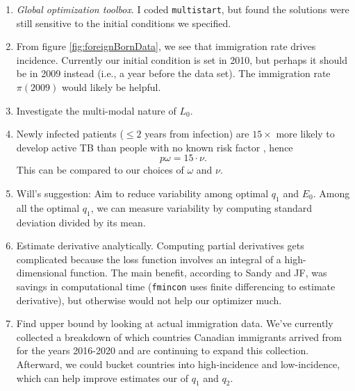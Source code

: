 \documentclass{article}
\begin{document}
\begin{enumerate}
		\item \emph{Global optimization toolbox}.  I coded \texttt{multistart}, but found the solutions were still sensitive to the initial conditions we specified. 
	\item From figure \ref{fig:foreignBornData}, we see that immigration rate drives incidence.  Currently our initial condition is set in 2010, but perhaps it should be in 2009 instead (i.e., a year before the data set).  The immigration rate $\pi(2009)$ would likely be helpful.
	\item Investigate the multi-modal nature of $L_0$.
	\item Newly infected patients ($\leq2$ years from infection) are $15\times$ more likely to develop active TB than people with no known risk factor \cite{PublicHealthAgencyofCanada2014CanadianStandards}, hence $$ p\omega = 15 \cdot \nu . $$  This can be compared to our choices of $\omega$ and $\nu$.
	
	
	\item Will's suggestion:  Aim to reduce variability among optimal $q_1$ and $E_0$.  Among all the optimal $q_1$, we can measure variability by computing standard deviation divided by its mean. 

		\item Estimate derivative analytically.  Computing partial derivatives gets complicated because the loss function involves an integral of a high-dimensional function.  The main benefit, according to Sandy and JF, was savings in computational time (\texttt{fmincon} uses finite differencing to estimate derivative), but otherwise would not help our optimizer much.
		
\item Find upper bound by looking at actual immigration data.  We've currently collected a breakdown of which countries Canadian immigrants arrived from for the years 2016-2020 and are continuing to expand this collection.  Afterward, we could bucket countries into high-incidence and low-incidence, which can help improve estimates our of $q_1$ and $q_2$.
	
\end{enumerate}




\end{document}
